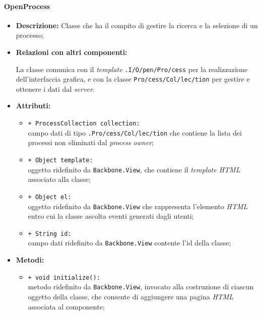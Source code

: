 \paragraph{OpenProcess}
\label{openProcess}
\begin{flushleft}
\begin{itemize}
\item \textbf{Descrizione:} Classe che ha il compito di gestire la ricerca e la selezione di un processo;
\item \textbf{Relazioni con altri componenti:}
\begin{sloppypar}
La classe comunica con il \textit{template} \texttt{\viewAdmin{}.I\fshyp{}O\fshyp{}pen\fshyp{}Pro\fshyp{}cess} per la realizzazione dell'interfaccia grafica, e con la classe \texttt{\collection{}Pro\fshyp{}cess\fshyp{}Col\fshyp{}lec\fshyp{}tion} per gestire e ottenere i dati dal \textit{server}.
\end{sloppypar}
\item \textbf{Attributi:}
\begin{sloppypar}
\begin{itemize}
\item \texttt{+ ProcessCollection collection:}\\ campo dati di tipo \texttt{\collection{}.Pro\fshyp{}cess\fshyp{}Col\fshyp{}lec\fshyp{}tion} che contiene la lista dei processi non eliminati dal \textit{process owner};
\item \texttt{+ Object template:}\\ oggetto ridefinito da \texttt{Backbone.View}, che contiene il \textit{template HTML} associato alla classe;
\item \texttt{+ Object el:}\\ oggetto ridefinito da \texttt{Backbone.View} che rappresenta l'elemento \textit{HTML} entro cui la classe ascolta eventi generati dagli utenti;
\item \texttt{+ String id:}\\ campo dati ridefinito da \texttt{Backbone.View} contente l'id della classe;
\end{itemize}
\end{sloppypar}
\item \textbf{Metodi:}
\begin{sloppypar}
\begin{itemize}
\item \texttt{+ void initialize():}\\ metodo ridefinito da \texttt{Backbone.View}, invocato alla costruzione di ciascun oggetto della classe, che consente di aggiungere una pagina \textit{HTML} associata al componente;

\end{itemize}
\end{sloppypar}
\end{itemize}
\end{flushleft}
